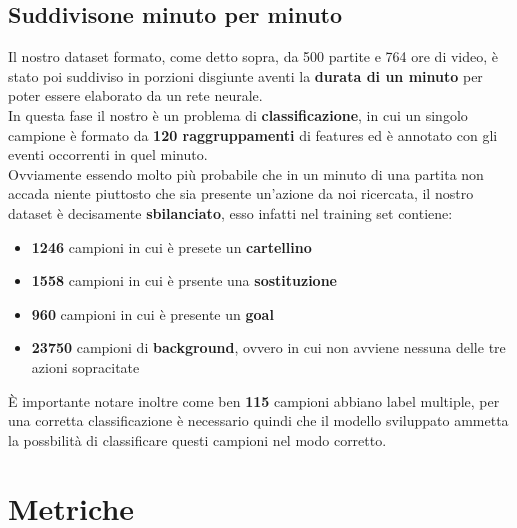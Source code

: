 \subsection{Suddivisone minuto per minuto}
Il nostro dataset formato, come detto sopra, da 500 partite e 764 ore di video, è stato poi suddiviso in porzioni disgiunte aventi la \textbf{durata di un minuto} per poter essere elaborato da un rete neurale.
\\In questa fase il nostro è un problema di \textbf{classificazione}, in cui un singolo campione è formato da \textbf{120 raggruppamenti} di features ed è annotato con gli eventi occorrenti in quel minuto.
\\Ovviamente essendo molto più probabile che in un minuto di una partita non accada niente piuttosto che sia presente un'azione da noi ricercata, il nostro dataset è decisamente \textbf{sbilanciato}, esso infatti nel training set contiene:
\begin{itemize}
\item \textbf{1246} campioni in cui è presete un \textbf{cartellino}
\item \textbf{1558} campioni in cui è prsente una \textbf{sostituzione}
\item \textbf{960} campioni in cui è presente un \textbf{goal}
\item \textbf{23750} campioni di \textbf{background}, ovvero in cui non avviene nessuna delle tre azioni sopracitate
\end{itemize}
È importante notare inoltre come ben \textbf{115} campioni abbiano label multiple, per una corretta classificazione è necessario quindi che il modello sviluppato ammetta la possbilità di classificare questi campioni nel modo corretto.
\section{Metriche}
